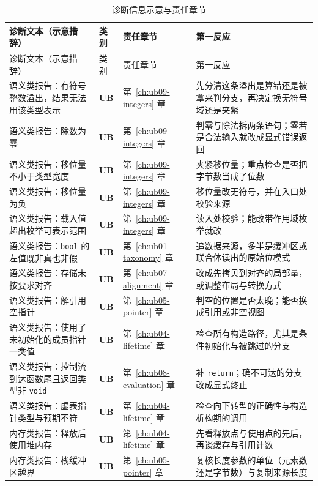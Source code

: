 \documentclass[12pt,a4paper,fontset=fandol]{ctexbook}
\newcommand{\Tp}[1]{\texttt{#1}}
\newcommand{\UB}{\textbf{\textsf{UB}}}
\begin{document}
\begin{longtable}{@{}>{\raggedright\arraybackslash}p{} >{\raggedright\arraybackslash}p{} >{\raggedright\arraybackslash}p{} >{\raggedright\arraybackslash}p{}@{}}
\caption{诊断信息示意与责任章节}\label{tab:apB-diag}\\
\toprule
诊断文本（示意措辞） & 类别 & 责任章节 & 第一反应 \\
\midrule
\endfirsthead
\toprule
诊断文本（示意措辞） & 类别 & 责任章节 & 第一反应 \\
\midrule
\endhead
\bottomrule
\endfoot
语义类报告：有符号整数溢出，结果无法用该类型表示 & \UB{} & 第~\ref{ch:ub09-integers} 章 & 先分清这条溢出是算错还是被拿来判分支，再决定换无符号域还是夹紧 \\
语义类报告：除数为零 & \UB{} & 第~\ref{ch:ub09-integers} 章 & 判零与除法拆两条语句；零若是合法输入就改成显式错误返回 \\
语义类报告：移位量不小于类型宽度 & \UB{} & 第~\ref{ch:ub09-integers} 章 & 夹紧移位量；重点检查是否把字节数当成了位数 \\
语义类报告：移位量为负 & \UB{} & 第~\ref{ch:ub09-integers} 章 & 移位量改无符号，并在入口处校验来源 \\
语义类报告：载入值超出枚举可表示范围 & \UB{} & 第~\ref{ch:ub09-integers} 章 & 读入处校验；能改带作用域枚举就改 \\
语义类报告：\Tp{bool} 的左值既非真也非假 & \UB{} & 第~\ref{ch:ub01-taxonomy} 章 & 追数据来源，多半是缓冲区或联合体读出的原始位模式 \\
语义类报告：存储未按要求对齐 & \UB{} & 第~\ref{ch:ub07-alignment} 章 & 改成先拷贝到对齐的局部量，或调整布局与转换方式 \\
语义类报告：解引用空指针 & \UB{} & 第~\ref{ch:ub05-pointer} 章 & 判空的位置是否太晚；能否换成引用或非空视图 \\
语义类报告：使用了未初始化的成员指针一类值 & \UB{} & 第~\ref{ch:ub04-lifetime} 章 & 检查所有构造路径，尤其是条件初始化与被跳过的分支 \\
语义类报告：控制流到达函数尾且返回类型非 \Tp{void} & \UB{} & 第~\ref{ch:ub08-evaluation} 章 & 补 \Tp{return}；确不可达的分支改成显式终止 \\
语义类报告：虚表指针类型与预期不符 & \UB{} & 第~\ref{ch:ub04-lifetime} 章 & 检查向下转型的正确性与构造析构期的调用 \\
内存类报告：释放后使用堆内存 & \UB{} & 第~\ref{ch:ub04-lifetime} 章 & 先看释放点与使用点的先后，再谈缓存与引用计数 \\
内存类报告：栈缓冲区越界 & \UB{} & 第~\ref{ch:ub05-pointer} 章 & 复核长度参数的单位（元素数还是字节数）与复制来源长度 \\

\end{longtable}
\end{document}
